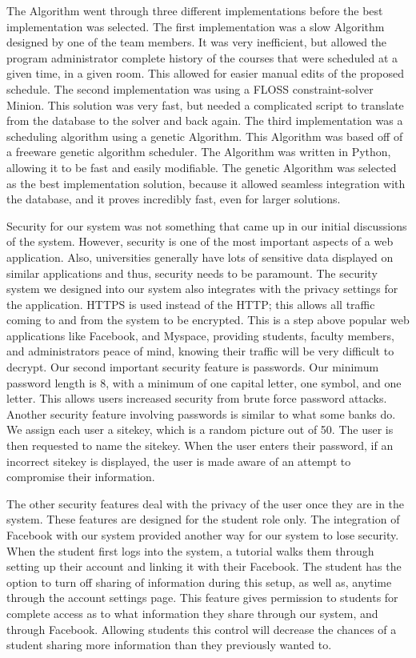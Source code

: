 \documentclass[12pt,article]{memoir}
\begin{document}
The Algorithm went through three different implementations before the best implementation was selected. The first implementation was a slow Algorithm designed by one of the team members. It was very inefficient, but allowed the program administrator complete history of the courses that were scheduled at a given time, in a given room. This allowed for easier manual edits of the proposed schedule. The second implementation was using a FLOSS constraint-solver Minion. This solution was very fast, but needed a complicated script to translate from the database to the solver and back again. The third implementation was a scheduling algorithm using a genetic Algorithm. This Algorithm was based off of a freeware genetic algorithm scheduler. The Algorithm was written in Python, allowing it to be fast and easily modifiable. The genetic Algorithm was selected as the best implementation solution, because it allowed seamless integration with the database, and it proves incredibly fast, even for larger solutions.

Security for our system was not something that came up in our initial discussions of the system. However, security is one of the most important aspects of a web application. Also, universities generally have lots of sensitive data displayed on similar applications and thus, security needs to be paramount. The security system we designed into our system also integrates with the privacy settings for the application. HTTPS is used instead of the HTTP; this allows all traffic coming to and from the system to be encrypted. This is a step above popular web applications like Facebook, and Myspace, providing students, faculty members, and administrators peace of mind, knowing their traffic will be very difficult to decrypt. Our second important security feature is passwords. Our minimum password length is 8, with a minimum of one capital letter, one symbol, and one letter. This allows users increased security from brute force password attacks. Another security feature involving passwords is similar to what some banks do. We assign each user a sitekey, which is a random picture out of 50. The user is then requested to name the sitekey. When the user enters their password, if an incorrect sitekey is displayed, the user is made aware of an attempt to compromise their information. 

The other security features deal with the privacy of the user once they are in the system. These features are designed for the student role only. The integration of Facebook with our system provided another way for our system to lose security. When the student first logs into the system, a tutorial walks them through setting up their account and linking it with their Facebook. The student has the option to turn off sharing of information during this setup, as well as, anytime through the account settings page. This feature gives permission to students for complete access as to what information they share through our system, and through Facebook. Allowing students this control will decrease the chances of a student sharing more information than they previously wanted to.
\end{document}
